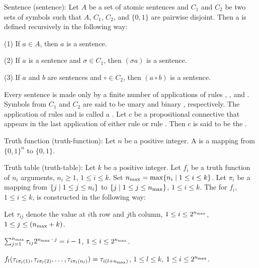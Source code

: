  Sentence (sentence):
  Let $A$ be a set of atomic sentences and $C_1$ and $C_2$ be two sets of
  symbols such that $A$, $C_1$, $C_2$, and $\{0, 1\}$ are pairwise disjoint.
  Then a  is defined recursively in the following way:
    \item(1) If $a \in A$, then $a$ is a sentence.
    \item(2) If $a$ is a sentence and $\sigma \in C_1$, then $(\sigma a)$ is a
      sentence.
    \item(3) If $a$ and $b$ are sentences and $\circ \in C_2$, then $(a \circ
      b)$ is a sentence.
    \item Every sentence is made only by a finite number of applications of
      rules , , and .
  \quit
  Symbols from $C_1$ and $C_2$ are said to be unary and binary
  , respectively. The application of rules
   and  is called a . Let $c$ be a propositional connective that appears in the last
  application of either rule  or rule . Then
  $c$ is said to be the .
\quit

 Truth function (truth-function):
  Let $n$ be a positive integer. A  is a mapping from
  $\{0, 1\}^n$ to $\{0, 1\}$.
\quit

 Truth table (truth-table):
  Let $k$ be a positive integer. Let $f_i$ be a truth function of $n_i$
  arguments, $n_i \ge 1$, $1 \le i \le k$. Set $n_{\rm max} = \max\{n_i \mathrel{|}
  1 \le i \le k\}$. Let $\pi_i$ be a mapping from $\{j \mathrel{|} 1 \le j \le n_i
  \}$ to $\{j \mathrel{|} 1 \le j \le n_{\rm max}\}$, $1 \le i \le k$. The
   for $f_i$, $1 \le i \le k$, is constructed in the
  following way:
    \item Let $\tau_{ij}$ denote the value at $i$th row and $j$th column, $1
      \le i \le 2^{n_{\rm max}}$, $1 \le j \le (n_{\rm max} + k)$.
    \item $\sum_{j = 1}^{n_{\rm max}} \tau_{ij} 2^{n_{\rm max} - j} = i - 1$,
      $1 \le i \le 2^{n_{\rm max}}$.
    \item $f_l(\tau_{i\pi_l(1)}, \tau_{i\pi_l(2)}, \ldots, \tau_{i\pi_l(n_l)})
      = \tau_{i(l + n_{\rm max})}$, $1 \le l \le k$, $1 \le i \le 2^{n_{\rm
      max}}$.
  \quit
\quit

